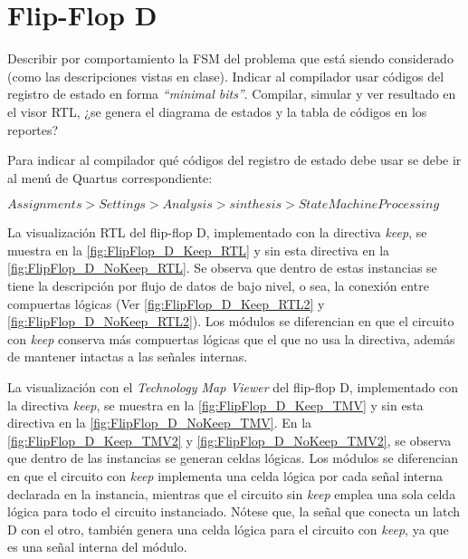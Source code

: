 \section{Flip-Flop D \label{sec:s3}}

\begin{center}
	\begin{minipage}{12cm}
		\begin{tcolorbox}[title=Actividad 3]
			 Describir por comportamiento la FSM del problema que está siendo considerado (como las descripciones vistas en clase). Indicar al compilador usar códigos del registro de estado en forma \textit{``minimal bits''}. Compilar, simular y ver resultado en el visor RTL, ¿se genera el diagrama de estados y la tabla de códigos en los reportes?
			 
			 Para indicar al compilador qué códigos del registro de estado debe usar se debe ir al menú de Quartus correspondiente:
			 
			 $Assignments > Settings > Analysis > sinthesis > State Machine Processing$
		\end{tcolorbox}	
	\end{minipage}
\end{center}

La visualización RTL del flip-flop D, implementado con la directiva \textit{keep}, se muestra en la \autoref{fig:FlipFlop_D_Keep_RTL} y sin esta directiva en la \autoref{fig:FlipFlop_D_NoKeep_RTL}. Se observa que dentro de estas instancias se tiene la descripción por flujo de datos de bajo nivel, o sea, la conexión entre compuertas lógicas (Ver \autoref{fig:FlipFlop_D_Keep_RTL2} y \autoref{fig:FlipFlop_D_NoKeep_RTL2}). Los módulos se diferencian en que el circuito con \textit{keep} conserva más compuertas lógicas que el que no usa la directiva, además de mantener intactas a las señales internas.

La visualización con el \textit{Technology Map Viewer} del flip-flop D, implementado con la directiva \textit{keep}, se muestra en la \autoref{fig:FlipFlop_D_Keep_TMV} y sin esta directiva en la \autoref{fig:FlipFlop_D_NoKeep_TMV}. En la \autoref{fig:FlipFlop_D_Keep_TMV2} y \autoref{fig:FlipFlop_D_NoKeep_TMV2}, se observa que dentro de las instancias se generan celdas lógicas. Los módulos se diferencian en que el circuito con \textit{keep} implementa una celda lógica por cada señal interna declarada en la instancia, mientras que el circuito sin \textit{keep} emplea una sola celda lógica para todo el circuito instanciado. Nótese que, la señal que conecta un latch D con el otro, también genera una celda lógica para el circuito con \textit{keep}, ya que es una señal interna del módulo.

